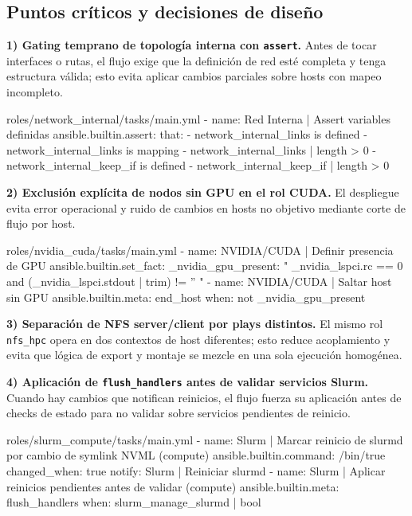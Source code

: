 \subsection{Puntos críticos y decisiones de diseño}
\textbf{1) Gating temprano de topología interna con \texttt{assert}.} Antes de tocar interfaces o rutas, el flujo exige que la definición de red esté completa y tenga estructura válida; esto evita aplicar cambios parciales sobre hosts con mapeo incompleto.

\begin{filecode}{roles/network_internal/tasks/main.yml}
- name: Red Interna | Assert variables definidas
  ansible.builtin.assert:
    that:
      - network_internal_links is defined
      - network_internal_links is mapping
      - network_internal_links | length > 0
      - network_internal_keep_if is defined
      - network_internal_keep_if | length > 0
\end{filecode}

\textbf{2) Exclusión explícita de nodos sin GPU en el rol CUDA.} El despliegue evita error operacional y ruido de cambios en hosts no objetivo mediante corte de flujo por host.

\begin{filecode}{roles/nvidia_cuda/tasks/main.yml}
- name: NVIDIA/CUDA | Definir presencia de GPU
  ansible.builtin.set_fact:
    _nvidia_gpu_present: "{{ _nvidia_lspci.rc == 0 and (_nvidia_lspci.stdout | trim) != '' }}"
- name: NVIDIA/CUDA | Saltar host sin GPU
  ansible.builtin.meta: end_host
  when: not _nvidia_gpu_present
\end{filecode}

\textbf{3) Separación de NFS server/client por plays distintos.} El mismo rol \texttt{nfs\_hpc} opera en dos contextos de host diferentes; esto reduce acoplamiento y evita que lógica de export y montaje se mezcle en una sola ejecución homogénea.

\textbf{4) Aplicación de \texttt{flush\_handlers} antes de validar servicios Slurm.} Cuando hay cambios que notifican reinicios, el flujo fuerza su aplicación antes de checks de estado para no validar sobre servicios pendientes de reinicio.

\begin{filecode}{roles/slurm_compute/tasks/main.yml}
- name: Slurm | Marcar reinicio de slurmd por cambio de symlink NVML (compute)
  ansible.builtin.command: /bin/true
  changed_when: true
  notify: Slurm | Reiniciar slurmd
- name: Slurm | Aplicar reinicios pendientes antes de validar (compute)
  ansible.builtin.meta: flush_handlers
  when: slurm_manage_slurmd | bool
\end{filecode}

